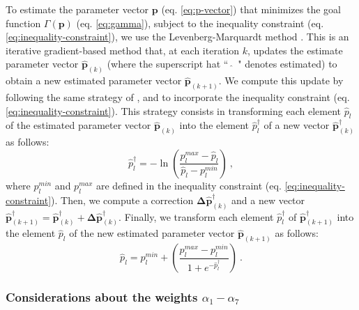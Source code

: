 To estimate the parameter vector $\mathbf{p}$ (eq. \ref{eq:p-vector}) that minimizes the goal function 
$\Gamma(\mathbf{p})$ (eq. \ref{eq:gamma}), subject to the inequality constraint (eq. \ref{eq:inequality-constraint}), we use the Levenberg-Marquardt method \cite[e.g., ][ p. 240]{aster-etal2019}. 
This is an iterative gradient-based method that, at each iteration $k$, updates the estimate parameter vector $\hat{\mathbf{p}}_{(k)}$ (where the superscript hat ``~$\hat{}$~" denotes estimated) 
to obtain a new estimated parameter vector $\hat{\mathbf{p}}_{(k+1)}$.
We compute this update by following the same strategy of \cite{barbosa-1999b}, \cite{oliveirajr-etal2011} and \cite{oliveirajr-barbosa2013} to incorporate the inequality constraint (eq. \ref{eq:inequality-constraint}). This strategy consists in transforming each element $\hat{p}_{l}$ of the estimated parameter vector 
$\hat{\mathbf{p}}_{(k)}$ into the element $\hat{p}^{\dagger}_{l}$ of a new vector $\hat{\mathbf{p}}^{\dagger}_{(k)}$ as follows:
\begin{equation}\label{eq:inequality-function}
\hat{p}^{\dagger}_{l} = -\ln\left(\frac{p_{l}^{max} - \hat{p}_{l}}{\hat{p}_{l} - p_{l}^{min}}\right) \: ,
\end{equation}
where $p_{l}^{min}$ and $p_{l}^{max}$ are defined in the inequality constraint 
(eq. \ref{eq:inequality-constraint}).
Then, we compute a correction $\boldsymbol{\Delta}\hat{\mathbf{p}}^{\dagger}_{(k)}$ and a new vector 
$\hat{\mathbf{p}}^{\dagger}_{(k+1)} = \hat{\mathbf{p}}^{\dagger}_{(k)} + \boldsymbol{\Delta}\hat{\mathbf{p}}^{\dagger}_{(k)}$.
Finally, we transform each element $\hat{p}^{\dagger}_{l}$ of $\hat{\mathbf{p}}^{\dagger}_{(k+1)}$ into the element 
$\hat{p}_{l}$ of the new estimated parameter vector $\hat{\mathbf{p}}_{(k+1)}$ as follows:
\begin{equation}\label{eq:inv-inequality-function}
\hat{p}_{l} = p_{l}^{min} + \left(\frac{p_{l}^{max} - p_{l}^{min}}{ 1 + e^{-\hat{p}^{\dagger}_{l}} }\right) \: .
\end{equation}


\subsubsection{Considerations about the weights $\alpha_{1}-\alpha_{7}$}

